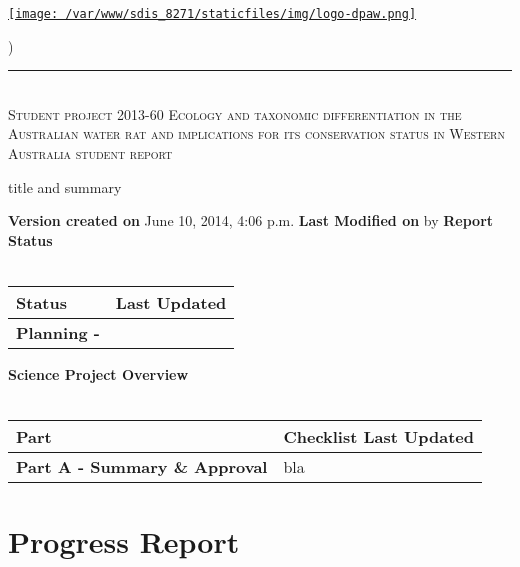 \documentclass[version=last, paper=a4, DIV=18, usenames, dvipsnames]{scrartcl}
\newcommand{\HRule}{\rule{\linewidth}{0.1pt}}
\begin{document}
\setcounter{secnumdepth}{-1}


\begin{titlepage}
\begin{center}
\begin{minipage}[t]{0.28\textwidth}
\begin{flushleft}
\href{http://www.dpaw.wa.gov.au}{\texttt{[image: /var/www/sdis\_8271/staticfiles/img/logo-dpaw.png]}}
\end{flushleft}
\end{minipage}
\begin{minipage}[b]{0.7\textwidth}
\begin{flushright}
    \href{http://sdis.dpaw.wa.gov.au/documents/studentreport/1126/download/}{}) \\
\end{flushright}
\end{minipage}
\HRule \\[0.4cm]
\vfill
\textsc{\Huge Student project 2013-60 Ecology and taxonomic differentiation in the Australian water rat and implications for its conservation status in Western Australia \newline }
\vfill
\textsc{\Huge student report}

\vfill\vfill\vfill\vfill
title and summary

\vfill\vfill\vfill\vfill\vfill\vfill\vfill\vfill

\textbf{Version created on} June 10, 2014, 4:06 p.m.
\vfill
\textbf{Last Modified on}  by 
\vfill\vfill
\textbf{Report Status}\\\,
\begin{tabu} to \linewidth { | X[l] | X | }
\hline
{}
Status & Last Updated \\
\hline
\textbf{Planning - } \\
\hline
\end{tabu}
\vfill
\textbf{Science Project Overview}\\\,
\begin{tabu} to \linewidth { | X[l] | X | }
\hline
{}
Part & Checklist Last Updated \\
\hline
\textbf{Part A - Summary \& Approval} & bla \\
\hline
\end{tabu}

\end{center}
\end{titlepage}

\setcounter{tocdepth}{2}
\tableofcontents
\clearpage






\section{Progress Report}





\clearpage
\end{document}
